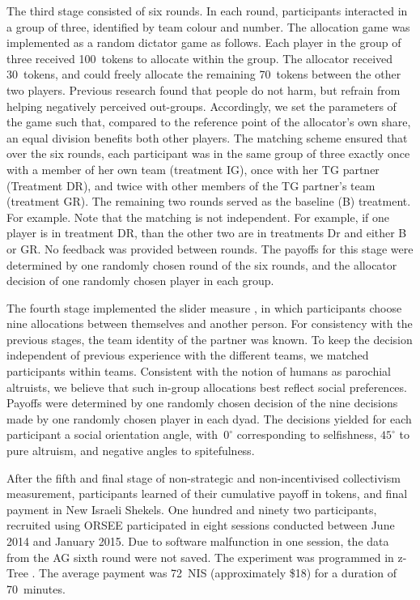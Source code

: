 \documentclass[12pt,a4paper]{article}
\begin{document}
The third stage consisted of six rounds. In each round, participants interacted in a group of three, identified by team colour and number. The allocation game was implemented as a random dictator game as follows. Each player in the group of three received 100~tokens to allocate within the group. The allocator received 30~tokens, and could freely allocate the remaining 70~tokens between the other two players. Previous research found that people do not harm, but refrain from helping negatively perceived out-groups. Accordingly, we set the parameters of the game such that, compared to the reference point of the allocator's own share, an equal division benefits both other players. The matching scheme ensured that over the six rounds, each participant was in the same group of three exactly once with a member of her own team (treatment IG), once with her TG partner (Treatment DR), and twice with other members of the TG partner's team (treatment GR). The remaining two rounds served as the baseline (B) treatment. For example. Note that the matching is not independent. For example, if one player is in treatment DR, than the other two are in treatments Dr and either B or GR. No feedback was provided between rounds.
The payoffs for this stage were determined by one randomly chosen round of the six rounds, and the allocator decision of one randomly chosen player in each group.

The fourth stage implemented the slider measure \citep*{murphy2011measuring,crosetto2012flexible}, in which participants choose nine allocations between themselves and another person. For consistency with the previous stages, the team identity of the partner was known. To keep the decision independent of previous experience with the different teams, we matched participants within teams. Consistent with the notion of humans as parochial altruists, we believe that such in-group allocations best reflect social preferences.
Payoffs were determined by one randomly chosen decision of the nine decisions made by one randomly chosen player in each dyad.
The decisions yielded for each participant a social orientation angle, with~$0^\circ$ corresponding to selfishness, $45^\circ$ to pure altruism, and negative angles to spitefulness.

After the fifth and final stage of non-strategic and non-incentivised collectivism measurement, participants learned of their cumulative payoff in tokens, and final payment in New Israeli Shekels.  One hundred and ninety two participants, recruited using ORSEE \citep*{greiner2015subject} participated in eight sessions conducted between June 2014 and January 2015. Due to software malfunction in one session, the data from the AG sixth round were not saved.
The experiment was programmed in z-Tree \citep*{Fischbacher2007}. The average payment was 72~NIS (approximately \$18) for a duration of 70~minutes.
\end{document}
